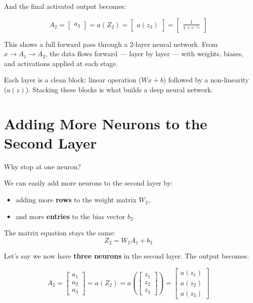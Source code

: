 \documentclass[11pt]{article}
\begin{document}
And the final activated output becomes:

\[
A_2 = 
\begin{bmatrix}
a_3
\end{bmatrix}
= a(Z_2) = 
\begin{bmatrix}
a(z_3)
\end{bmatrix}
= \begin{bmatrix}
\frac{1}{1 + e^{-z_3}}
\end{bmatrix}
\]

This shows a full forward pass through a 2-layer neural network.  
From $x \rightarrow A_1 \rightarrow A_2$, the data flows forward — layer by layer —  
with weights, biases, and activations applied at each stage.

\begin{insightbox}[title=Key Insight]
Each layer is a clean block: linear operation ($Wx + b$) followed by a non-linearity ($a(z)$).  
Stacking these blocks is what builds a deep neural network.
\end{insightbox}
\section{Adding More Neurons to the Second Layer}

Why stop at one neuron?

We can easily add more neurons to the second layer by:

\begin{itemize}
  \item adding more \textbf{rows} to the weight matrix $W_2$,
  \item and more \textbf{entries} to the bias vector $b_2$.
\end{itemize}

\begin{recapbox}[title={Same Logic, More Neurons}]
The matrix equation stays the same:
\[
Z_2 = W_2 A_1 + b_2
\]
\end{recapbox}

Let’s say we now have \textbf{three neurons} in the second layer.  
The output becomes:

\[
A_2 = 
\begin{bmatrix}
a_1 \\
a_2 \\
a_3
\end{bmatrix}
= a(Z_2) = 
a\left(
\begin{bmatrix}
z_1 \\
z_2 \\
z_3
\end{bmatrix}
\right)
=
\begin{bmatrix}
a(z_1) \\
a(z_2) \\
a(z_3)
\end{bmatrix}
\]
\end{document}

